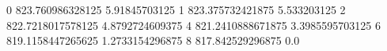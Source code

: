 0 823.760986328125 5.91845703125
1 823.375732421875 5.533203125
2 822.7218017578125 4.8792724609375
4 821.2410888671875 3.3985595703125
6 819.1158447265625 1.2733154296875
8 817.842529296875 0.0
